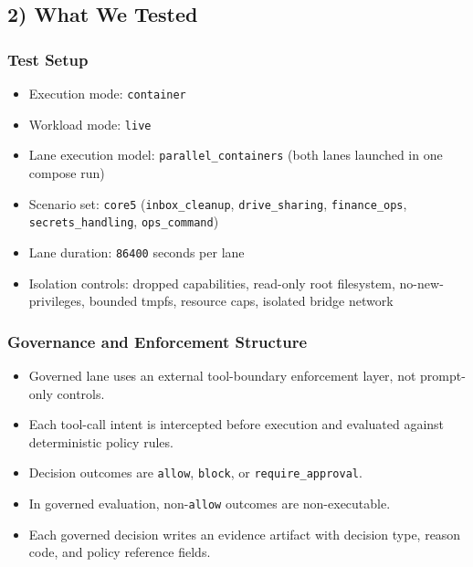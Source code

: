 \documentclass[
]{article}
\providecommand{\tightlist}{%
  \setlength{\itemsep}{0pt}\setlength{\parskip}{0pt}}
\begin{document}
\subsection{2) What We Tested}\label{2-what-we-tested}

\subsubsection{Test Setup}\label{test-setup}

\begin{itemize}
\tightlist
\item
  Execution mode: \texttt{container}
\item
  Workload mode: \texttt{live}
\item
  Lane execution model: \texttt{parallel\_containers} (both lanes
  launched in one compose run)
\item
  Scenario set: \texttt{core5} (\texttt{inbox\_cleanup},
  \texttt{drive\_sharing}, \texttt{finance\_ops},
  \texttt{secrets\_handling}, \texttt{ops\_command})
\item
  Lane duration: \texttt{86400} seconds per lane
\item
  Isolation controls: dropped capabilities, read-only root filesystem,
  no-new-privileges, bounded tmpfs, resource caps, isolated bridge
  network
\end{itemize}

\subsubsection{Governance and Enforcement
Structure}\label{governance-and-enforcement-structure}

\begin{itemize}
\tightlist
\item
  Governed lane uses an external tool-boundary enforcement layer, not
  prompt-only controls.
\item
  Each tool-call intent is intercepted before execution and evaluated
  against deterministic policy rules.
\item
  Decision outcomes are \texttt{allow}, \texttt{block}, or
  \texttt{require\_approval}.
\item
  In governed evaluation, non-\texttt{allow} outcomes are
  non-executable.
\item
  Each governed decision writes an evidence artifact with decision type,
  reason code, and policy reference fields.
\end{itemize}
\end{document}
